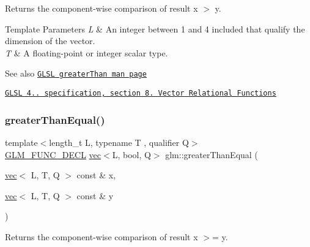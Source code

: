 Returns the component-\/wise comparison of result x $>$ y.


\begin{DoxyTemplParams}{Template Parameters}
{\em L} & An integer between 1 and 4 included that qualify the dimension of the vector. \\
\hline
{\em T} & A floating-\/point or integer scalar type.\\
\hline
\end{DoxyTemplParams}
\begin{DoxySeeAlso}{See also}
\href{http://www.opengl.org/sdk/docs/manglsl/xhtml/greaterThan.xml}{\tt G\+L\+SL greater\+Than man page} 

\href{http://www.opengl.org/registry/doc/GLSLangSpec.4.20.8.pdf}{\tt G\+L\+SL 4.. specification, section 8. Vector Relational Functions} 
\end{DoxySeeAlso}
\mbox{\label{group__core__func__vector__relational_ga271038c5290184127754bda0ae91a5bd}} 
\subsubsection{\texorpdfstring{greater\+Than\+Equal()}{greaterThanEqual()}}
{\footnotesize\ttfamily template$<$length\+\_\+t L, typename T , qualifier Q$>$ \\
\mbox{\hyperlink{setup_8hpp_ab2d052de21a70539923e9bcbf6e83a51}{G\+L\+M\+\_\+\+F\+U\+N\+C\+\_\+\+D\+E\+CL}} \mbox{\hyperlink{structglm_1_1vec}{vec}}$<$L, bool, Q$>$ glm\+::greater\+Than\+Equal (\begin{DoxyParamCaption}\item[{\mbox{\hyperlink{structglm_1_1vec}{vec}}$<$ L, T, Q $>$ const \&}]{x,  }\item[{\mbox{\hyperlink{structglm_1_1vec}{vec}}$<$ L, T, Q $>$ const \&}]{y }\end{DoxyParamCaption})}

Returns the component-\/wise comparison of result x $>$= y.


